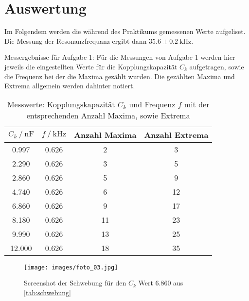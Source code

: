 \section{Auswertung}
\label{sec:Auswertung}




Im Folgendem werden die während des Praktikums gemessenen Werte aufgeliset.
Die Messung der Resonanzfrequanz ergibt dann
    $35.6 \pm 0.2 \: \si{\kilo\hertz}$.

Messergebnisse für Aufgabe 1:
Für die Messungen von Aufgabe 1 werden hier jeweils die eingestellten Werte für die Kopplungskapazität $C_k$ aufgetragen, sowie die Frequenz bei der die Maxima gezählt wurden. Die gezählten Maxima und Extrema allgemein werden dahinter notiert. 

\begin{table}
  \centering
  \caption{Messwerte: Kopplungskapazität $C_k $ und Frequenz $f$ mit der entsprechenden Anzahl Maxima, sowie Extrema}
  \label{tab:schwebung}
  \begin{tabular}{c c c c}
    \toprule 
    $C_k \:/\: \si{\nano\farad}$ & $f \:/\: \si{\kilo\hertz}$ & Anzahl Maxima &  Anzahl Extrema   \\ 
    \midrule 
    0.997 & 0.626 & 2 & 3 \\
    2.290 & 0.626 & 3 & 5 \\
    2.860 & 0.626 & 5 & 9 \\
    4.740 & 0.626 & 6 & 12 \\
    6.860 & 0.626 & 9 & 17 \\
    8.180 & 0.626 & 11 & 23 \\
    9.990 & 0.626 & 13 & 25 \\
    12.000 & 0.626 & 18 & 35 \\
    \bottomrule
  \end{tabular}
\end{table}

\begin{figure}
  \centering
  \texttt{[image: images/foto\_03.jpg]}
  \caption{Screenshot der Schwebung für den $C_k$ Wert $6.860$ aus \autoref{tab:schwebung}}
\end{figure}

